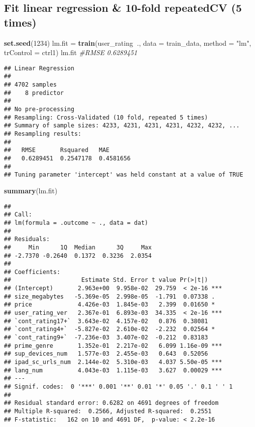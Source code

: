 \documentclass[]{article}
\newenvironment{Shaded}{\begin{snugshade}}{\end{snugshade}}
\newcommand{\KeywordTok}[1]{\textcolor[rgb]{0.13,0.29,0.53}{\textbf{#1}}}
\newcommand{\DataTypeTok}[1]{\textcolor[rgb]{0.13,0.29,0.53}{#1}}
\newcommand{\DecValTok}[1]{\textcolor[rgb]{0.00,0.00,0.81}{#1}}
\newcommand{\StringTok}[1]{\textcolor[rgb]{0.31,0.60,0.02}{#1}}
\newcommand{\CommentTok}[1]{\textcolor[rgb]{0.56,0.35,0.01}{\textit{#1}}}
\newcommand{\OperatorTok}[1]{\textcolor[rgb]{0.81,0.36,0.00}{\textbf{#1}}}
\newcommand{\NormalTok}[1]{#1}
\begin{document}
\subsection{Fit linear regression \& 10-fold repeatedCV (5
times)}\label{fit-linear-regression-10-fold-repeatedcv-5-times}

\begin{Shaded}
\begin{Highlighting}[]
\KeywordTok{set.seed}\NormalTok{(}\DecValTok{1234}\NormalTok{)}
\NormalTok{lm.fit =}\StringTok{ }\KeywordTok{train}\NormalTok{(user_rating}\OperatorTok{~}\NormalTok{.,}
               \DataTypeTok{data =}\NormalTok{ train_data,}
               \DataTypeTok{method =} \StringTok{"lm"}\NormalTok{,}
               \DataTypeTok{trControl =}\NormalTok{ ctrl1)}
\NormalTok{lm.fit }\CommentTok{#RMSE 0.6289451}
\end{Highlighting}
\end{Shaded}

\begin{verbatim}
## Linear Regression 
## 
## 4702 samples
##    8 predictor
## 
## No pre-processing
## Resampling: Cross-Validated (10 fold, repeated 5 times) 
## Summary of sample sizes: 4233, 4231, 4231, 4231, 4232, 4232, ... 
## Resampling results:
## 
##   RMSE       Rsquared   MAE      
##   0.6289451  0.2547178  0.4581656
## 
## Tuning parameter 'intercept' was held constant at a value of TRUE
\end{verbatim}

\begin{Shaded}
\begin{Highlighting}[]
\KeywordTok{summary}\NormalTok{(lm.fit)}
\end{Highlighting}
\end{Shaded}

\begin{verbatim}
## 
## Call:
## lm(formula = .outcome ~ ., data = dat)
## 
## Residuals:
##     Min      1Q  Median      3Q     Max 
## -2.7370 -0.2640  0.1372  0.3236  2.0354 
## 
## Coefficients:
##                    Estimate Std. Error t value Pr(>|t|)    
## (Intercept)       2.963e+00  9.958e-02  29.759  < 2e-16 ***
## size_megabytes   -5.369e-05  2.998e-05  -1.791  0.07338 .  
## price             4.426e-03  1.845e-03   2.399  0.01650 *  
## user_rating_ver   2.367e-01  6.893e-03  34.335  < 2e-16 ***
## `cont_rating17+`  3.643e-02  4.157e-02   0.876  0.38081    
## `cont_rating4+`  -5.827e-02  2.610e-02  -2.232  0.02564 *  
## `cont_rating9+`  -7.236e-03  3.407e-02  -0.212  0.83183    
## prime_genre       1.352e-01  2.217e-02   6.099 1.16e-09 ***
## sup_devices_num   1.577e-03  2.455e-03   0.643  0.52056    
## ipad_sc_urls_num  2.144e-02  5.310e-03   4.037 5.50e-05 ***
## lang_num          4.043e-03  1.115e-03   3.627  0.00029 ***
## ---
## Signif. codes:  0 '***' 0.001 '**' 0.01 '*' 0.05 '.' 0.1 ' ' 1
## 
## Residual standard error: 0.6282 on 4691 degrees of freedom
## Multiple R-squared:  0.2566, Adjusted R-squared:  0.2551 
## F-statistic:   162 on 10 and 4691 DF,  p-value: < 2.2e-16
\end{verbatim}
\end{document}
